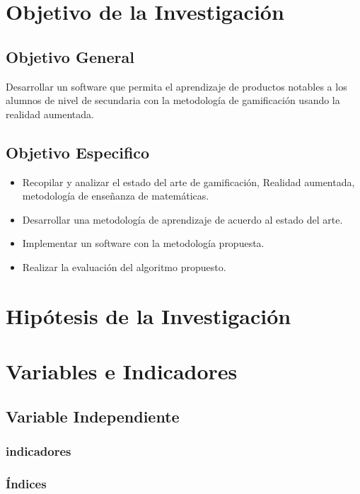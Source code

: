 \section{Objetivo de la Investigación}
    \subsection{Objetivo General}

Desarrollar un software que permita el aprendizaje de productos notables a los alumnos de nivel de secundaria con la metodología de gamificación usando la realidad aumentada.

    \subsection{Objetivo Especifico}

        \begin{itemize}
            \item Recopilar y analizar el estado del arte de gamificación, Realidad aumentada, metodología de enseñanza de matemáticas.
            \item Desarrollar una metodología de aprendizaje de acuerdo al estado del arte.
            \item Implementar un software con la metodología propuesta.
            \item Realizar la evaluación del algoritmo propuesto.
        \end{itemize}

\section{Hipótesis de la Investigación}

\section{Variables e Indicadores}

\subsection{Variable Independiente}
\subsubsection{indicadores}
\subsubsection{Índices}
